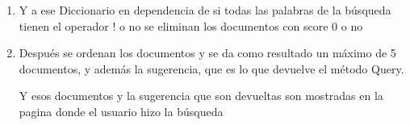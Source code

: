 \begin{frame}
    \begin{enumerate}

        \item Y a ese Diccionario en dependencia de si
              todas las palabras de la búsqueda tienen el
              operador !  o no se 	eliminan los documentos
              con score 0 o no

        \item Después se ordenan los documentos y se
              da como resultado un máximo de 5 documentos,
              y además la sugerencia, que es lo que devuelve
              el método Query.

                  {\large Y esos documentos y la sugerencia que
                      son devueltas son mostradas en la pagina
                      donde el usuario hizo la búsqueda}


    \end{enumerate}

\end{frame}


